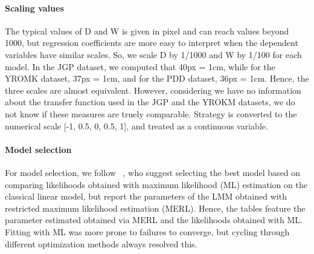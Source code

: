 \documentclass[acmlarge, manuscript,review]{acmart}
\begin{document}

\paragraph{Scaling values}
The typical values of D and W is given in pixel and can reach values beyond 1000, but regression coefficients are more easy to interpret when the dependent variables have similar scales. So, we scale D by 1/1000 and W by 1/100 for each model. In the JGP dataset, we computed that 40px = 1cm, while for the YROMK dataset, 37px = 1cm, and for the PDD dataset, 36px = 1cm. Hence, the three scales are almost equivalent. However, considering we have no information about the transfer function used in the JGP and the YROKM datasets, we do not know if these measures are truely comparable.
Strategy is converted to the numerical scale [-1, 0.5, 0, 0.5, 1], and treated as a continuous variable. 

\paragraph{Model selection}
For model selection, we follow \citeauthor{zuur2009}~\cite{zuur2009}, who suggest selecting the best model based on comparing likelihoods obtained with maximum likelihood (ML) estimation on the classical linear model, but report the parameters of the LMM obtained with restricted maximum likelihood estimation (MERL). Hence, the tables feature the parameter estimated obtained via MERL and the likelihoods obtained with ML. Fitting with ML was more prone to failures to converge, but cycling through different optimization methods always resolved this.
\end{document}
